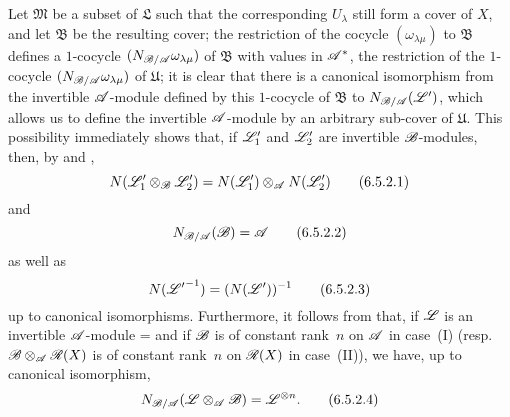 \begin{env}[6.5.2]
Let $\mathfrak{M}$ be a subset of $\mathfrak{L}$ such that the corresponding $U_\lambda$ still form a cover of $X$, and let $\mathfrak{B}$ be the resulting cover;
the restriction of the cocycle $(\omega_{\lambda\mu})$ to $\mathfrak{B}$ defines a $1$-cocycle $(N_{\mathscr{B}/\mathscr{A}}\omega_{\lambda\mu})$ of $\mathfrak{B}$ with values in $\mathscr{A}^*$, the restriction of the $1$-cocycle $(N_{\mathscr{B}/\mathscr{A}}\omega_{\lambda\mu})$ of $\mathfrak{U}$;
it is clear that there is a canonical isomorphism from the invertible $\mathscr{A}$-module defined by this $1$-cocycle of $\mathfrak{B}$ to $N_{\mathscr{B}/\mathscr{A}}(\mathscr{L}')$, which allows us to define the invertible $\mathscr{A}$-module by an arbitrary sub-cover of $\mathfrak{U}$.
This possibility immediately shows that, if $\mathscr{L}'_1$ and $\mathscr{L}'_2$ are invertible $\mathscr{B}$-modules, then, by  and ,
\[
\label{II.6.5.2.1}
  N(\mathscr{L}'_1\otimes_{\mathscr{B}}\mathscr{L}'_2) = N(\mathscr{L}'_1)\otimes_{\mathscr{A}}N(\mathscr{L}'_2)
\tag{6.5.2.1}
\]
and
\[
\label{II.6.5.2.2}
  N_{\mathscr{B}/\mathscr{A}}(\mathscr{B}) = \mathscr{A}
\tag{6.5.2.2}
\]
as well as
\[
\label{II.6.5.2.3}
  N({\mathscr{L}'}^{-1}) = (N(\mathscr{L}'))^{-1}
\tag{6.5.2.3}
\]
up to canonical isomorphisms.
Furthermore, it follows from  that, if $\mathscr{L}$ is an invertible $\mathscr{A}$-module = and if $\mathscr{B}$ is of constant rank~$n$ on $\mathscr{A}$ in case~(I) (resp. $\mathscr{B}\otimes_{\mathscr{A}}\mathscr{R}(X)$ is of constant rank~$n$ on $\mathscr{R}(X)$ in case~(II)), we have, up to canonical isomorphism,
\[
\label{II.6.5.2.4}
  N_{\mathscr{B}/\mathscr{A}}(\mathscr{L}\otimes_{\mathscr{A}}\mathscr{B}) = \mathscr{L}^{\otimes n}.
\tag{6.5.2.4}
\]
\end{env}

